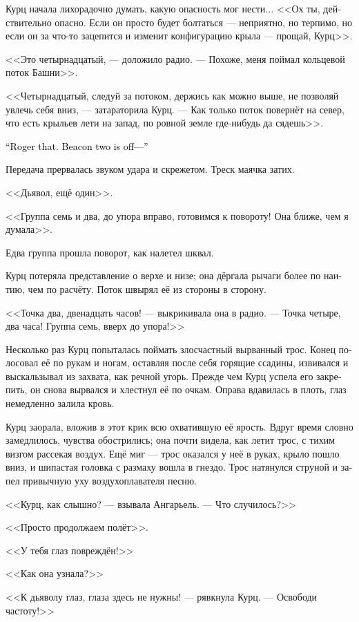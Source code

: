 \documentclass[a4paper,12pt,fleqn]{book}\usepackage{cooltooltips}\usepackage{polyglossia}\setdefaultlanguage[babelshorthands=true]{russian}\setotherlanguage{english}\defaultfontfeatures{Ligatures=TeX,Mapping=tex-text} \usepackage{xcolor}\definecolor{lightgray}{HTML}{bbbbbb}\color{lightgray}\newcommand{\ml}[3]{\textenglish{\textcolor{black}{#3}}}
\begin{document}
Курц начала лихорадочно думать, какую опасность мог нести...
<<Ох ты, действительно опасно.
Если он просто будет болтаться --- неприятно, но терпимо, но если он за что-то зацепится и изменит конфигурацию крыла --- прощай, Курц>>.

<<Это четырнадцатый, --- доложило радио.
--- Похоже, меня поймал кольцевой поток Башни>>.

<<Четырнадцатый, следуй за потоком, держись как можно выше, не позволяй увлечь себя вниз, --- затараторила Курц.
--- Как только поток повернёт на север, что есть крыльев лети на запад, по ровной земле где-нибудь да сядешь>>.

\ml{$0$}
{<<Понял.}
{``Roger that.}
\ml{$0$}
{Ориентир два --- отбой...>>}
{Beacon two is off---''}

Передача прервалась звуком удара и скрежетом.
Треск маячка затих.

<<Дьявол, ещё один>>.

<<Группа семь и два, до упора вправо, готовимся к повороту!
Она ближе, чем я думала>>.

Едва группа прошла поворот, как налетел шквал.

Курц потеряла представление о верхе и низе;
она дёргала рычаги более по наитию, чем по расчёту.
Поток швырял её из стороны в сторону.

<<Точка два, двенадцать часов! --- выкрикивала она в радио.
--- Точка четыре, два часа!
Группа семь, вверх до упора!>>

Несколько раз Курц попыталась поймать злосчастный вырванный трос.
Конец полосовал её по рукам и ногам, оставляя после себя горящие ссадины, извивался и выскальзывал из захвата, как речной угорь.
Прежде чем Курц успела его закрепить, он снова вырвался и хлестнул её по очкам.
Оправа вдавилась в плоть, глаз немедленно залила кровь.

Курц заорала, вложив в этот крик всю охватившую её ярость.
Вдруг время словно замедлилось, чувства обострились;
она почти видела, как летит трос, с тихим визгом рассекая воздух.
Ещё миг --- трос оказался у неё в руках, крыло пошло вниз, и шипастая головка с размаху вошла в гнездо.
Трос натянулся струной и запел привычную уху воздухоплавателя песню.

<<Курц, как слышно? --- взывала Ангарьель.
--- Что случилось?>>

<<Просто продолжаем полёт>>.

<<У тебя глаз повреждён!>>

<<Как она узнала?>>

<<К дьяволу глаз, глаза здесь не нужны! --- рявкнула Курц.
--- Освободи частоту!>>
\end{document}
